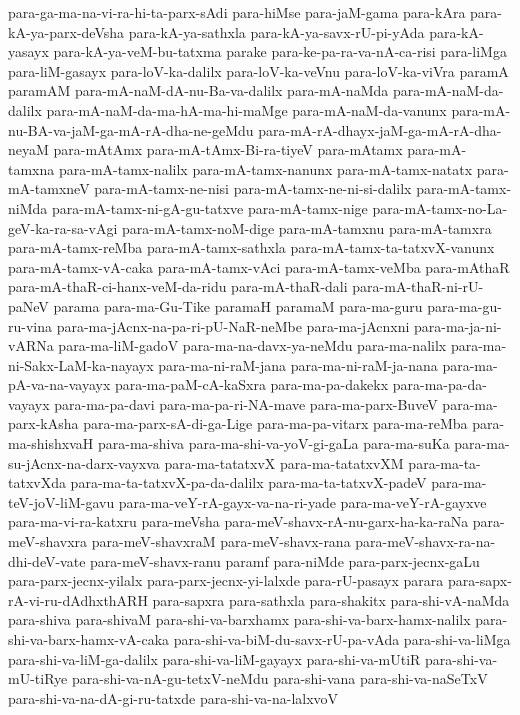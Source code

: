 {para-ga-ma-na-vi-ra-hi-ta-parx-sAdi
para-hiMse
para-jaM-gama
para-kAra
para-kA-ya-parx-deVsha
para-kA-ya-sathxla
para-kA-ya-savx-rU-pi-yAda
para-kA-yasayx
para-kA-ya-veM-bu-tatxma
parake
para-ke-pa-ra-va-nA-ca-risi
para-liMga
para-liM-gasayx
para-loV-ka-dalilx
para-loV-ka-veVnu
para-loV-ka-viVra
paramA
paramAM
para-mA-naM-dA-nu-Ba-va-dalilx
para-mA-naMda
para-mA-naM-da-dalilx
para-mA-naM-da-ma-hA-ma-hi-maMge
para-mA-naM-da-vanunx
para-mA-nu-BA-va-jaM-ga-mA-rA-dha-ne-geMdu
para-mA-rA-dhayx-jaM-ga-mA-rA-dha-neyaM
para-mAtAmx
para-mA-tAmx-Bi-ra-tiyeV
para-mAtamx
para-mA-tamxna
para-mA-tamx-nalilx
para-mA-tamx-nanunx
para-mA-tamx-natatx
para-mA-tamxneV
para-mA-tamx-ne-nisi
para-mA-tamx-ne-ni-si-dalilx
para-mA-tamx-niMda
para-mA-tamx-ni-gA-gu-tatxve
para-mA-tamx-nige
para-mA-tamx-no-La-geV-ka-ra-sa-vAgi
para-mA-tamx-noM-dige
para-mA-tamxnu
para-mA-tamxra
para-mA-tamx-reMba
para-mA-tamx-sathxla
para-mA-tamx-ta-tatxvX-vanunx
para-mA-tamx-vA-caka
para-mA-tamx-vAci
para-mA-tamx-veMba
para-mAthaR
para-mA-thaR-ci-hanx-veM-da-ridu
para-mA-thaR-dali
para-mA-thaR-ni-rU-paNeV
parama
para-ma-Gu-Tike
paramaH
paramaM
para-ma-guru
para-ma-gu-ru-vina
para-ma-jAcnx-na-pa-ri-pU-NaR-neMbe
para-ma-jAcnxni
para-ma-ja-ni-vARNa
para-ma-liM-gadoV
para-ma-na-davx-ya-neMdu
para-ma-nalilx
para-ma-ni-Sakx-LaM-ka-nayayx
para-ma-ni-raM-jana
para-ma-ni-raM-ja-nana
para-ma-pA-va-na-vayayx
para-ma-paM-cA-kaSxra
para-ma-pa-dakekx
para-ma-pa-da-vayayx
para-ma-pa-davi
para-ma-pa-ri-NA-mave
para-ma-parx-BuveV
para-ma-parx-kAsha
para-ma-parx-sA-di-ga-Lige
para-ma-pa-vitarx
para-ma-reMba
para-ma-shishxvaH
para-ma-shiva
para-ma-shi-va-yoV-gi-gaLa
para-ma-suKa
para-ma-su-jAcnx-na-darx-vayxva
para-ma-tatatxvX
para-ma-tatatxvXM
para-ma-ta-tatxvXda
para-ma-ta-tatxvX-pa-da-dalilx
para-ma-ta-tatxvX-padeV
para-ma-teV-joV-liM-gavu
para-ma-veY-rA-gayx-va-na-ri-yade
para-ma-veY-rA-gayxve
para-ma-vi-ra-katxru
para-meVsha
para-meV-shavx-rA-nu-garx-ha-ka-raNa
para-meV-shavxra
para-meV-shavxraM
para-meV-shavx-rana
para-meV-shavx-ra-na-dhi-deV-vate
para-meV-shavx-ranu
paramf
para-niMde
para-parx-jecnx-gaLu
para-parx-jecnx-yilalx
para-parx-jecnx-yi-lalxde
para-rU-pasayx
parara
para-sapx-rA-vi-ru-dAdhxthARH
para-sapxra
para-sathxla
para-shakitx
para-shi-vA-naMda
para-shiva
para-shivaM
para-shi-va-barxhamx
para-shi-va-barx-hamx-nalilx
para-shi-va-barx-hamx-vA-caka
para-shi-va-biM-du-savx-rU-pa-vAda
para-shi-va-liMga
para-shi-va-liM-ga-dalilx
para-shi-va-liM-gayayx
para-shi-va-mUtiR
para-shi-va-mU-tiRye
para-shi-va-nA-gu-tetxV-neMdu
para-shi-vana
para-shi-va-naSeTxV
para-shi-va-na-dA-gi-ru-tatxde
para-shi-va-na-lalxvoV
}
